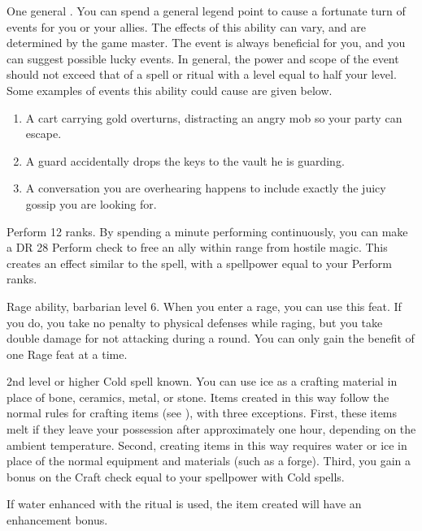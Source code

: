 \featpre One general .
\featben You can spend a general legend point to cause a fortunate turn of events for you or your allies.
The effects of this ability can vary, and are determined by the game master.
The event is always beneficial for you, and you can suggest possible lucky events.
In general, the power and scope of the event should not exceed that of a spell or ritual with a level equal to half your level.
Some examples of events this ability could cause are given below.
\begin{enumerate}
    \item A cart carrying gold overturns, distracting an angry mob so your party can escape.
    \item A guard accidentally drops the keys to the vault he is guarding.
    \item A conversation you are overhearing happens to include exactly the juicy gossip you are looking for.
\end{enumerate}

\featpre Perform 12 ranks.
\featben By spending a minute performing continuously, you can make a DR 28 Perform check to free an ally within \rngmed range from hostile magic.
This creates an effect similar to the 
spell, with a spellpower equal to your Perform ranks.

\featpre Rage ability, barbarian level 6.
\featben When you enter a rage, you can use this feat. If you do, you take no penalty to physical defenses while raging, but you take double damage for not attacking during a round.
 You can only gain the benefit of one Rage feat at a time.

\featpre 2nd level or higher Cold spell known.
\featben You can use ice as a crafting material in place of bone, ceramics, metal, or stone.
Items created in this way follow the normal rules for crafting items (see ), with three exceptions.
First, these items melt if they leave your possession after approximately one hour, depending on the ambient temperature.
Second, creating items in this way requires water or ice in place of the normal equipment and materials (such as a forge).
Third, you gain a bonus on the Craft check equal to your spellpower with Cold spells.

If water enhanced with the  ritual is used, the item created will have an enhancement bonus.

